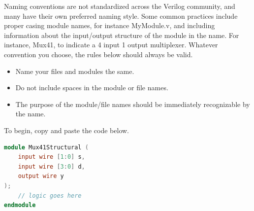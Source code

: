 \documentclass[12pt]{labmanual}
\begin{document}
\begin{extra}[frametitle={Naming Conventions}]
    Naming conventions are not standardized across the Verilog community, and many have their own preferred naming style. Some common practices include proper casing module names, for instance MyModule.v, and including information about the input/output structure of the module in the name. For instance, Mux41, to indicate a 4 input 1 output multiplexer. Whatever convention you choose, the rules below should always be valid.
\begin{itemize}
    \item Name your files and modules the same.
    \item Do not include spaces in the module or file names.
    \item The purpose of the module/file names should be immediately recognizable by the name.
\end{itemize}
\end{extra}

To begin, copy and paste the code below.

\begin{lstlisting}[language=Verilog]
module Mux41Structural (
    input wire [1:0] s, 
    input wire [3:0] d,
    output wire y
);
    // logic goes here
endmodule
\end{lstlisting}
\end{document}
